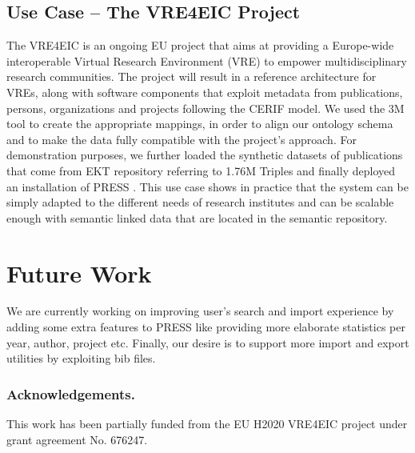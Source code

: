 \documentclass[runningheads,a4paper]{llncs}
\begin{document}
\subsection{Use Case -- The VRE4EIC Project}

The VRE4EIC is an ongoing EU project that aims at providing a Europe-wide interoperable Virtual Research Environment (VRE) to empower multidisciplinary research communities. The project will result in a reference architecture for VREs, along with software components that exploit metadata from publications, persons, organizations and projects following the CERIF model. We used the 3M tool  \cite{_Ref490665546} to create the appropriate mappings, in order to align our ontology schema and to make the data fully compatible with the project's approach. For demonstration purposes, we further loaded the synthetic datasets of publications that come from EKT repository referring to 1.76M Triples and finally deployed an installation of PRESS  \cite{_Ref490664467}. This use case shows in practice that the system can be simply adapted to the different needs of research institutes and can be scalable enough with semantic linked data that are located in the semantic repository.

\section{Future Work}

We are currently working on improving user's search and import experience by adding some extra features to PRESS like providing more elaborate statistics per year, author, project etc. Finally, our desire is to support more import and export utilities by exploiting bib files. 

\subsubsection*{Acknowledgements.}This work has been partially funded from the EU H2020 VRE4EIC project under grant agreement No. 676247.
\end{document}
